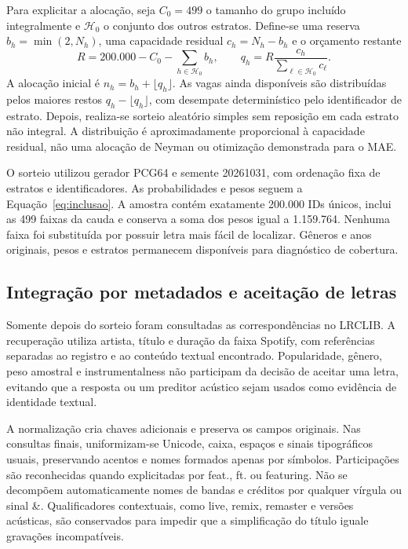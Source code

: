 Para explicitar a alocação, seja $C_0=499$ o tamanho do grupo incluído integralmente e $\mathcal H_0$ o conjunto dos outros estratos. Define-se uma reserva $b_h=\min(2,N_h)$, uma capacidade residual $c_h=N_h-b_h$ e o orçamento restante
\begin{equation}\label{eq:orcamento}
 R=200.000-C_0-\sum_{h\in\mathcal H_0}b_h,\qquad
 q_h=R\frac{c_h}{\sum_{\ell\in\mathcal H_0}c_\ell}.
\end{equation}
A alocação inicial é $n_h=b_h+\lfloor q_h\rfloor$. As vagas ainda disponíveis são distribuídas pelos maiores restos $q_h-\lfloor q_h\rfloor$, com desempate determinístico pelo identificador de estrato. Depois, realiza-se sorteio aleatório simples sem reposição em cada estrato não integral. A distribuição é aproximadamente proporcional à capacidade residual, não uma alocação de Neyman ou otimização demonstrada para o MAE.

O sorteio utilizou gerador PCG64 e semente 20261031, com ordenação fixa de estratos e identificadores. As probabilidades e pesos seguem a Equação~\ref{eq:inclusao}. A amostra contém exatamente 200.000 IDs únicos, inclui as 499 faixas da cauda e conserva a soma dos pesos igual a 1.159.764. Nenhuma faixa foi substituída por possuir letra mais fácil de localizar. Gêneros e anos originais, pesos e estratos permanecem disponíveis para diagnóstico de cobertura.

\subsection{Integração por metadados e aceitação de letras}\label{subsec:integracao}
Somente depois do sorteio foram consultadas as correspondências no LRCLIB. A recuperação utiliza artista, título e duração da faixa Spotify, com referências separadas ao registro e ao conteúdo textual encontrado. Popularidade, gênero, peso amostral e instrumentalness não participam da decisão de aceitar uma letra, evitando que a resposta ou um preditor acústico sejam usados como evidência de identidade textual.

A normalização cria chaves adicionais e preserva os campos originais. Nas consultas finais, uniformizam-se Unicode, caixa, espaços e sinais tipográficos usuais, preservando acentos e nomes formados apenas por símbolos. Participações são reconhecidas quando explicitadas por feat., ft. ou featuring. Não se decompõem automaticamente nomes de bandas e créditos por qualquer vírgula ou sinal \&. Qualificadores contextuais, como live, remix, remaster e versões acústicas, são conservados para impedir que a simplificação do título iguale gravações incompatíveis.

